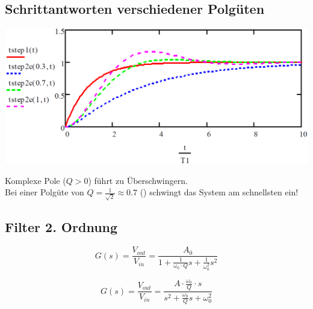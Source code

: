 \subsection{Schrittantworten verschiedener Polgüten}

\begin{minipage}[c]{0.48\columnwidth}
    \includegraphics[width=\columnwidth]{images/schrittantwort_verschiedene_polgueten.png}
\end{minipage}
\hfill
\begin{minipage}[c]{0.48\columnwidth}
    Komplexe Pole ($Q > 0$) führt zu Überschwingern. \\
    Bei einer Polgüte von $Q = \frac{1}{\sqrt{2}} \approx 0.7$ () schwingt das System am schnellsten ein!
\end{minipage}


\subsection{Filter 2. Ordnung}

\begin{minipage}[c]{0.48\columnwidth}
    \begin{center}
    \end{center}
    $$ \boxed{ G(s) = \frac{V_{out}}{V_{in}} = \frac{A_0}{1 + \frac{1}{\omega_0 \cdot Q} s + \frac{1}{\omega_0^2} s^2 } } $$
\end{minipage}
\hfill
\begin{minipage}[c]{0.48\columnwidth}
    \begin{center}
    \end{center}
    $$ \boxed{ G(s) = \frac{V_{out}}{V_{in}} = \frac{A \cdot \frac{\omega_0}{Q} \cdot s}{s^2 +  \frac{\omega_0}{Q} s + \omega_0^2 } } $$
\end{minipage}

